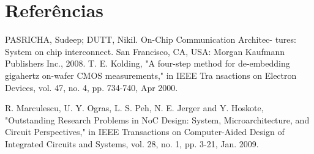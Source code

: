 \documentclass[conference]{IEEEtran}
\begin{document}
	
	\section*{Referências}
	\renewcommand{\section}[2]{}
	
	\begin{thebibliography}{00}
		  PASRICHA, Sudeep; DUTT, Nikil. On-Chip Communication Architec-
		tures: System on chip interconnect. San Francisco, CA, USA: Morgan Kaufmann Publishers Inc., 2008.
		T. E. Kolding, "A four-step method for de-embedding gigahertz on-wafer CMOS measurements," in IEEE Tra
		nsactions on Electron Devices, vol. 47, no. 4, pp. 734-740, Apr 2000.
		
		R. Marculescu, U. Y. Ogras, L. S. Peh, N. E. Jerger and Y. Hoskote, "Outstanding Research Problems in NoC Design: System, Microarchitecture, and Circuit Perspectives," in IEEE Transactions on Computer-Aided Design of Integrated Circuits and Systems, vol. 28, no. 1, pp. 3-21, Jan. 2009.
		

\end{thebibliography}
\end{document}
